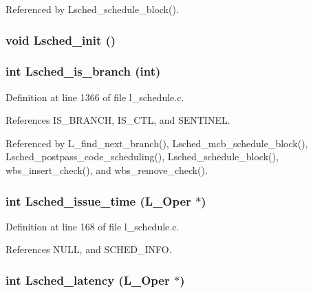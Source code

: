 Referenced by Lsched\_\-schedule\_\-block().
\subsubsection{\setlength{\rightskip}{0pt plus 5cm}void Lsched\_\-init ()}\label{l__schedule_8h_3764ca0089d2ec24309d9baec7d2696e}


\subsubsection{\setlength{\rightskip}{0pt plus 5cm}int Lsched\_\-is\_\-branch (int)}\label{l__schedule_8h_b90bfe92560ffd5c0809222feb68344f}




Definition at line 1366 of file l\_\-schedule.c.

References IS\_\-BRANCH, IS\_\-CTL, and SENTINEL.

Referenced by L\_\-find\_\-next\_\-branch(), Lsched\_\-mcb\_\-schedule\_\-block(), Lsched\_\-postpass\_\-code\_\-scheduling(), Lsched\_\-schedule\_\-block(), wbs\_\-insert\_\-check(), and wbs\_\-remove\_\-check().
\subsubsection{\setlength{\rightskip}{0pt plus 5cm}int Lsched\_\-issue\_\-time (L\_\-Oper $\ast$)}\label{l__schedule_8h_97ce712a4c1677368c240d83e2d779c8}




Definition at line 168 of file l\_\-schedule.c.

References NULL, and SCHED\_\-INFO.
\subsubsection{\setlength{\rightskip}{0pt plus 5cm}int Lsched\_\-latency (L\_\-Oper $\ast$)}\label{l__schedule_8h_703567119cde60627277b89680e7c56a}




